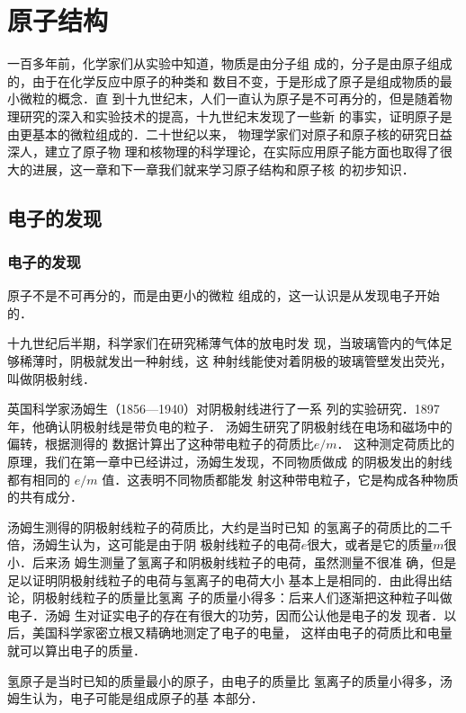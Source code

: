 \chapter{原子结构}

一百多年前，化学家们从实验中知道，物质是由分子组
成的，分子是由原子组成的，由于在化学反应中原子的种类和
数目不变，于是形成了原子是组成物质的最小微粒的概念．直
到十九世纪末，人们一直认为原子是不可再分的，但是随着物
理研究的深入和实验技术的提高，十九世纪末发现了一些新
的事实，证明原子是由更基本的微粒组成的．二十世纪以来，
物理学家们对原子和原子核的研究日益深人，建立了原子物
理和核物理的科学理论，在实际应用原子能方面也取得了很
大的进展，这一章和下一章我们就来学习原子结构和原子核
的初步知识．


\section{电子的发现}
\subsection{电子的发现}


原子不是不可再分的，而是由更小的微粒
组成的，这一认识是从发现电子开始的．

十九世纪后半期，科学家们在研究稀薄气体的放电时发
现，当玻璃管内的气体足够稀薄时，阴极就发出一种射线，这
种射线能使对着阴极的玻璃管壁发出荧光，叫做阴极射线．

英国科学家汤姆生（1856—1940）对阴极射线进行了一系
列的实验研究．1897年，他确认阴极射线是带负电的粒子．
汤姆生研究了阴极射线在电场和磁场中的偏转，根据测得的
数据计算出了这种带电粒子的荷质比$e/m$．
这种测定荷质比的
原理，我们在第一章中已经讲过，汤姆生发现，不同物质做成
的阴极发出的射线都有相同的
$e/m$
值．这表明不同物质都能发
射这种带电粒子，它是构成各种物质的共有成分．

汤姆生测得的阴极射线粒子的荷质比，大约是当时已知
的氢离子的荷质比的二千倍，汤姆生认为，这可能是由于阴
极射线粒子的电荷$e$很大，或者是它的质量$m$很小．后来汤
姆生测量了氢离子和阴极射线粒子的电荷，虽然测量不很准
确，但是足以证明阴极射线粒子的电荷与氢离子的电荷大小
基本上是相同的．由此得出结论，阴极射线粒子的质量比氢离
子的质量小得多：后来人们逐渐把这种粒子叫做电子．汤姆
生对证实电子的存在有很大的功劳，因而公认他是电子的发
现者．以后，美国科学家密立根又精确地测定了电子的电量，
这样由电子的荷质比和电量就可以算出电子的质量．

氢原子是当时已知的质量最小的原子，由电子的质量比
氢离子的质量小得多，汤姆生认为，电子可能是组成原子的基
本部分．

